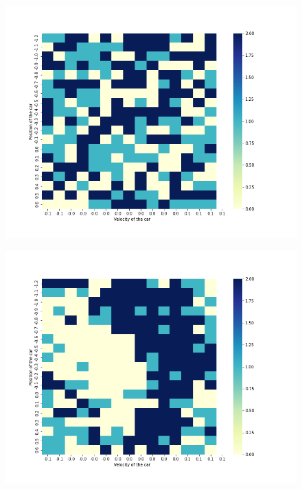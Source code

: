 \documentclass{article}
\begin{document}
    \begin{figure}[H]
        \graphicspath{ {../experiments/MountainCar/} }
        \centering
        \begin{minipage}{.33\textwidth}
        \nonumber
          \centering
          \includegraphics[width=\linewidth]{Mountaincar_montecarlo_policy.png}
          \label{fig:test1}
        \end{minipage}%
        \begin{minipage}{.33\textwidth}
        \nonumber
          \centering
          \includegraphics[width=\linewidth]{Mountaincar_sarsa_policy.png}

\end{minipage}
\end{figure}
\end{document}
